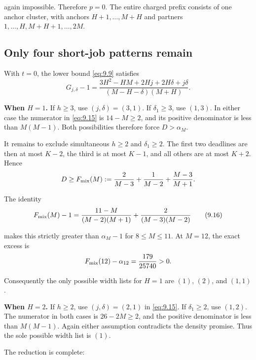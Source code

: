 \documentclass[11pt,a4paper]{article}
\begin{document}
again impossible. Therefore \(p=0\). The entire charged prefix consists of one anchor cluster, with anchors \(H+1,\ldots,M+H\) and partners \(1,\ldots,H,M+H+1,\ldots,2M\).

\hypertarget{only-four-short-job-patterns-remain}{%
\subsection{Only four short-job patterns remain}\label{only-four-short-job-patterns-remain}}

With \(t=0\), the lower bound \eqref{eq:9.9} satisfies
\begin{equation}
G_{j,\delta}-1
 =\frac{3H^2-HM+2Hj+2H\delta+j\delta}
 {(M-H-\delta)(M+H)}.
\tag{9.15}
\label{eq:9.15}
\end{equation}

\textbf{When \(H=1\).} If \(h\ge 3\), use \((j,\delta)=(3,1)\). If \(\delta_1\ge 3\), use \((1,3)\). In either case the numerator in \eqref{eq:9.15} is \(14-M\ge 2\), and its positive denominator is less than \(M(M-1)\). Both possibilities therefore force \(D>\alpha_M\).

It remains to exclude simultaneous \(h\ge 2\) and \(\delta_1\ge 2\). The first two deadlines are then at most \(K-2\), the third is at most \(K-1\), and all others are at most \(K+2\). Hence
\[
 D\ge F_{\rm mix}(M):=
 \frac2{M-3}+\frac1{M-2}+\frac{M-3}{M+1}.
\]

The identity
\begin{equation}
F_{\rm mix}(M)-1
 =\frac{11-M}{(M-2)(M+1)}
  +\frac2{(M-3)(M-2)}
\tag{9.16}
\label{eq:9.16}
\end{equation}

makes this strictly greater than \(\alpha_M-1\) for \(8\le M\le 11\). At \(M=12\), the exact excess is
\[
 F_{\rm mix}(12)-\alpha_{12}=\frac{179}{25740}>0.
\]

Consequently the only possible width lists for \(H=1\) are \((1)\), \((2)\), and \((1,1)\).

\textbf{When \(H=2\).} If \(h\ge 2\), use \((j,\delta)=(2,1)\) in \eqref{eq:9.15}. If \(\delta_1\ge 2\), use \((1,2)\). The numerator in both cases is \(26-2M\ge 2\), and the positive denominator is less than \(M(M-1)\). Again either assumption contradicts the density promise. Thus the sole possible width list is \((1)\).

The reduction is complete:
\end{document}
